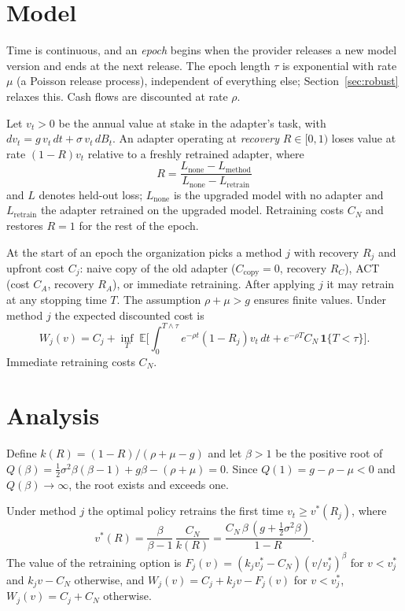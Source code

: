 \documentclass[ijoc,nonblindrev]{informs4}
\newcommand{\E}{\mathbb{E}}
\begin{document}
\section{Model}\label{sec:model}

Time is continuous, and an \emph{epoch} begins when the provider releases a new model version and ends at the next
release. The epoch length $\tau$ is exponential with rate $\mu$ (a Poisson release process), independent of
everything else; Section~\ref{sec:robust} relaxes this. Cash flows are discounted at rate $\rho$.

Let $v_t>0$ be the annual value at stake in the adapter's task, with
$dv_t = g\,v_t\,dt + \sigma\,v_t\,dB_t$. An adapter operating at \emph{recovery} $R\in[0,1)$ loses value at rate
$(1-R)v_t$ relative to a freshly retrained adapter, where
\begin{equation}
R=\frac{L_{\text{none}}-L_{\text{method}}}{L_{\text{none}}-L_{\text{retrain}}}
\end{equation}
and $L$ denotes held-out loss; $L_{\text{none}}$ is the upgraded model with no adapter and $L_{\text{retrain}}$ the
adapter retrained on the upgraded model. Retraining costs $C_N$ and restores $R=1$ for the rest of the epoch.

At the start of an epoch the organization picks a method $j$ with recovery $R_j$ and upfront cost $C_j$: naive copy
of the old adapter ($C_{\text{copy}}=0$, recovery $R_C$), ACT (cost $C_A$, recovery $R_A$), or immediate retraining.
After applying $j$ it may retrain at any stopping time $T$. The assumption $\rho+\mu>g$ ensures finite values. Under
method $j$ the expected discounted cost is
\begin{equation}
W_j(v)=C_j+\inf_{T}\;\E\Big[\int_0^{T\wedge\tau}e^{-\rho t}(1-R_j)v_t\,dt+e^{-\rho T}C_N\,\mathbf 1\{T<\tau\}\Big].
\end{equation}
Immediate retraining costs $C_N$.

\section{Analysis}\label{sec:analysis}

Define $k(R)=(1-R)/(\rho+\mu-g)$ and let $\beta>1$ be the positive root of
$Q(\beta)=\tfrac12\sigma^2\beta(\beta-1)+g\beta-(\rho+\mu)=0$. Since $Q(1)=g-\rho-\mu<0$ and
$Q(\beta)\to\infty$, the root exists and exceeds one.

\begin{proposition}\label{prop:thr}
Under method $j$ the optimal policy retrains the first time $v_t\ge v^*(R_j)$, where
\begin{equation}
v^*(R)=\frac{\beta}{\beta-1}\,\frac{C_N}{k(R)}=\frac{C_N\,\beta\,(g+\tfrac12\sigma^2\beta)}{1-R}.
\end{equation}
The value of the retraining option is $F_j(v)=(k_jv^*_j-C_N)(v/v^*_j)^\beta$ for $v<v^*_j$ and $k_jv-C_N$ otherwise, and
$W_j(v)=C_j+k_jv-F_j(v)$ for $v<v^*_j$, $W_j(v)=C_j+C_N$ otherwise.
\end{proposition}
\end{document}
